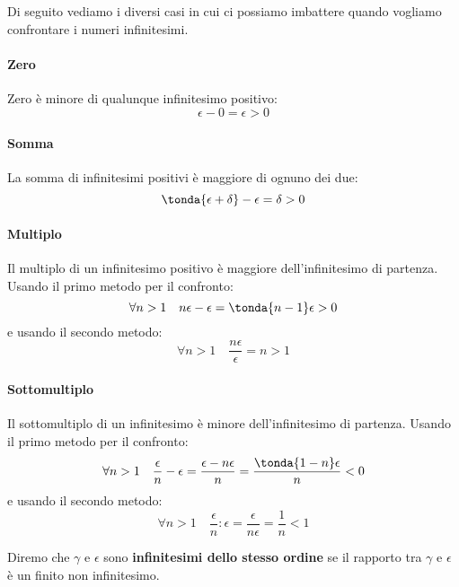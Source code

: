 Di seguito vediamo i diversi casi in cui ci possiamo 
imbattere quando vogliamo confrontare i numeri infinitesimi.

\paragraph{Zero}
Zero è minore di qualunque infinitesimo positivo:
\[\epsilon-0 = \epsilon>0\]
\paragraph{Somma}
La somma di infinitesimi positivi è maggiore di ognuno dei due:
\[\tonda{\epsilon+\delta}-\epsilon = \delta > 0\]
\paragraph{Multiplo}
Il multiplo di un infinitesimo positivo è maggiore dell'infinitesimo di 
partenza. Usando il primo metodo per il confronto:
\[\forall n > 1 \quad n\epsilon-\epsilon = \tonda{n-1}\epsilon > 0\]
e usando il secondo metodo: 
\[\forall n > 1 \quad \frac{n\epsilon}{\epsilon} = n > 1\]
\paragraph{Sottomultiplo}
Il sottomultiplo di un infinitesimo è minore dell'infinitesimo di partenza. 
Usando il primo metodo per il confronto:
\[\forall n > 1 \quad \frac{\epsilon}{n}-\epsilon = 
                      \frac{\epsilon-n\epsilon}{n} = 
                      \frac{\tonda{1-n}\epsilon}{n} < 0\]
e usando il secondo metodo: 
\[\forall n > 1 \quad \frac{\epsilon}{n}:\epsilon =
                      \frac{\epsilon}{n\epsilon} =
                      \frac{1}{n} < 1\]
\begin{definizione}
 Diremo che \(\gamma\) e \(\epsilon\) sono \textbf{infinitesimi dello 
stesso ordine} se il rapporto tra \(\gamma\) e \(\epsilon\) è un 
finito non infinitesimo.
\end{definizione}
